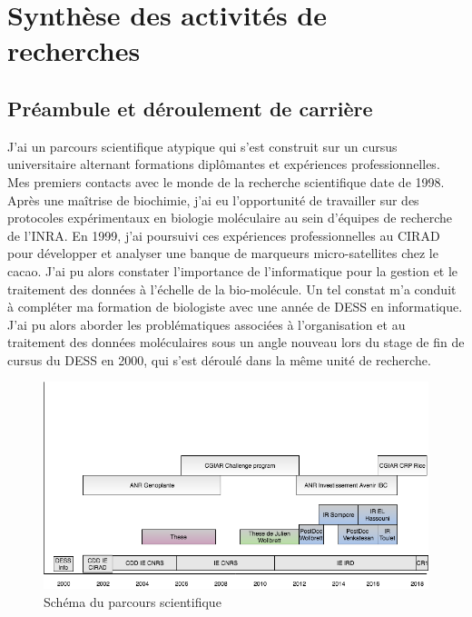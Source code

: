 \chapter{Synthèse des activités de recherches} %

\label{synthese} %

\section{Préambule et déroulement de carrière}
J’ai un parcours scientifique atypique qui s’est construit sur un cursus universitaire alternant formations diplômantes et expériences professionnelles. Mes premiers contacts avec le monde de la recherche scientifique date de 1998. Après une maîtrise de biochimie, j’ai eu l’opportunité de travailler sur des protocoles expérimentaux en biologie moléculaire au sein d’équipes de recherche de l’INRA. En 1999, j’ai poursuivi ces expériences professionnelles au CIRAD pour développer et analyser une banque de marqueurs micro-satellites chez le cacao. J’ai pu alors constater l’importance de l’informatique pour la gestion et le traitement des données à l’échelle de la bio-molécule. Un tel constat m’a conduit à compléter ma formation de biologiste avec une année de DESS en informatique. J’ai pu alors aborder les problématiques associées à l’organisation et au traitement des données moléculaires sous un angle nouveau lors du stage de fin de cursus du DESS en 2000, qui s’est déroulé dans la même unité de recherche. \\

\begin{figure}[!ht]
\begin{center}
	\includegraphics[width=1\textwidth]{Figures/Parcours-overview.png}
\end{center}
\label{overview}
\caption{ Schéma du parcours scientifique}
\end{figure}

